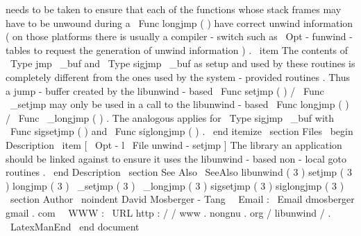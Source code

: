 needs
to
be
taken
to
ensure
that
each
of
the
functions
whose
stack
frames
may
have
to
be
unwound
during
a
\
Func
{
longjmp
}
(
)
have
correct
unwind
information
(
on
those
platforms
there
is
usually
a
compiler
-
switch
such
as
\
Opt
{
-
funwind
-
tables
}
to
request
the
generation
of
unwind
information
)
.
\
item
The
contents
of
\
Type
{
jmp
\
_buf
}
and
\
Type
{
sigjmp
\
_buf
}
as
setup
and
used
by
these
routines
is
completely
different
from
the
ones
used
by
the
system
-
provided
routines
.
Thus
a
jump
-
buffer
created
by
the
libunwind
-
based
\
Func
{
setjmp
}
(
)
/
\
Func
{
\
_setjmp
}
may
only
be
used
in
a
call
to
the
libunwind
-
based
\
Func
{
longjmp
}
(
)
/
\
Func
{
\
_longjmp
}
(
)
.
The
analogous
applies
for
\
Type
{
sigjmp
\
_buf
}
with
\
Func
{
sigsetjmp
}
(
)
and
\
Func
{
siglongjmp
}
(
)
.
\
end
{
itemize
}
\
section
{
Files
}
\
begin
{
Description
}
\
item
[
\
Opt
{
-
l
}
\
File
{
unwind
-
setjmp
}
]
The
library
an
application
should
be
linked
against
to
ensure
it
uses
the
libunwind
-
based
non
-
local
goto
routines
.
\
end
{
Description
}
\
section
{
See
Also
}
\
SeeAlso
{
libunwind
(
3
)
}
setjmp
(
3
)
longjmp
(
3
)
\
_setjmp
(
3
)
\
_longjmp
(
3
)
sigsetjmp
(
3
)
siglongjmp
(
3
)
\
section
{
Author
}
\
noindent
David
Mosberger
-
Tang
\
\
Email
:
\
Email
{
dmosberger
gmail
.
com
}
\
\
WWW
:
\
URL
{
http
:
/
/
www
.
nongnu
.
org
/
libunwind
/
}
.
\
LatexManEnd
\
end
{
document
}
